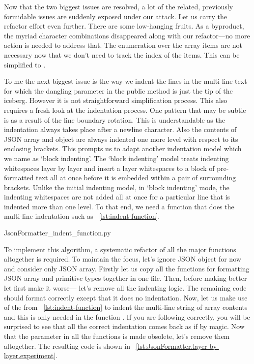 Now that the two biggest issues are resolved, a lot of the related,
previously formidable issues are suddenly exposed under our attack.
Let us carry the refactor effort even further.
There are some low-hanging fruits.
As a byproduct, the myriad character combinations disappeared along with our
refactor---no more action is needed to address that.
The enumeration 
over the array items are not necessary now that we don't need to track the
index of the items.
This can be simplified to .

To me the next biggest issue is the way we indent the lines in the multi-line text
for which the dangling parameter  in the public method 
is just the tip of the iceberg.
However it is not straightforward simplification process.
This also requires a fresh look at the indentation process.
One pattern that may be subtle is  as a result of the line
boundary rotation.
This is understandable as the indentation always takes place after a newline character.
Also the contents of JSON array and object are always indented one more level with respect to its
enclosing brackets.
This prompts us to adapt another indentation model which we name as `block indenting'.
The `block indenting' model treats indenting whitespaces layer by layer and
insert a layer whitespaces to a block of pre-formatted text all at once before it is embedded
within a pair of surrounding brackets.
Unlike the initial indenting model, in `block indenting' mode,
the indenting whitespaces are not added all at once for
a particular line that is indented more than one level.
To that end, we need a function that does the multi-line indentation
such as ~\autoref{lst:indent-function}.


{JsonFormatter_indent_function.py}

To implement this algorithm, a systematic refactor of all the major functions altogether
is required.
To maintain the focus, let's ignore JSON object for now and consider only JSON array.
Firstly let us copy all the functions for formatting JSON array and primitive types together in
one file.
Then, before making better let first make it worse---
let's remove all the indenting logic.
The remaining code should format correctly except that it does no indentation.
Now, let us make use of the  from
~\autoref{lst:indent-function} to indent the multi-line string of array contents and
this is only needed in the function .
If you are following correctly, you will be surprised to see that all the correct indentation comes
back as if by magic.
Now that the parameter  in all the functions is made obsolete, let's remove them
altogether.
The resulting code is shown in ~\autoref{lst:JsonFormatter.layer-by-layer.experiment}.

